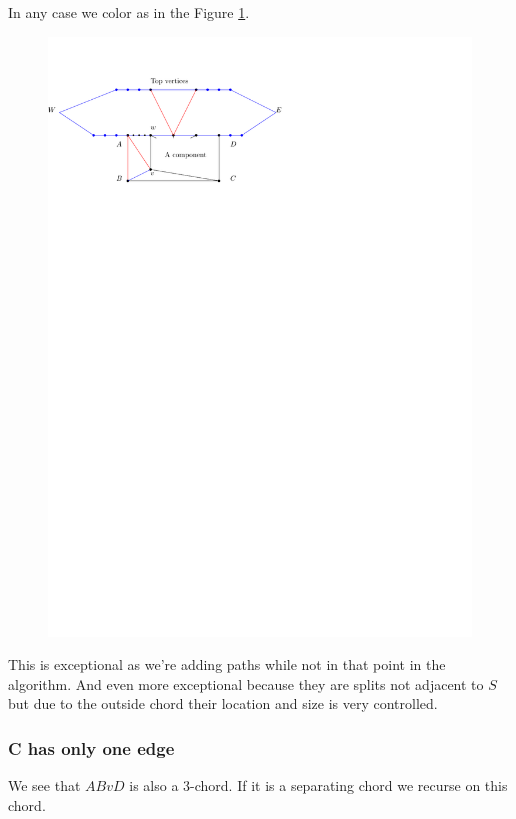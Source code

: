 In any case we color as in the Figure \ref{fig:shrink:boneedge}.

\begin{figure}[h]
  \centering
  \includegraphics[scale=1]{chordShrink/img/bOneEdge}
  \caption{}
  \label{fig:shrink:boneedge}
\end{figure}

This is exceptional as we're adding paths while not in that point in the algorithm. And even more exceptional because they are splits not adjacent to $S$ but due to the outside chord their location and size is very controlled.

\subsubsection{C has only one edge}
We see that $ABvD$ is also a 3-chord. If it is a separating chord we recurse on this chord.


